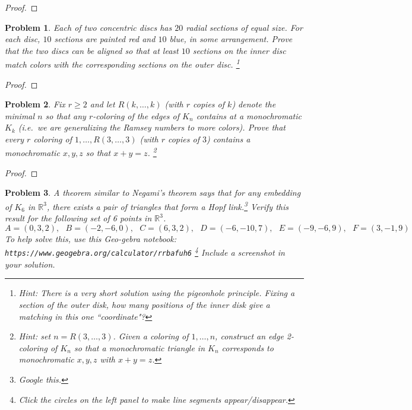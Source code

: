 \documentclass[11pt]{article}
\newtheorem{problem}{Problem}
\begin{document}
\begin{proof}

\end{proof}

\pagebreak 

\begin{problem}
Each of two concentric discs has $20$ radial sections of equal size. For each disc, $10$ sections are painted red and $10$ blue, in some arrangement. Prove that the two discs can be aligned so that at least $10$ sections on the inner disc match colors with the corresponding sections on the outer disc. \footnote{Hint: There is a very short solution using the pigeonhole principle. Fixing a section of the outer disk, how many positions of the inner disk give a matching in this one ``coordinate"?}
\end{problem}

\begin{proof}

\end{proof}

\pagebreak 

\begin{problem}
Fix $r\ge2$ and let $R(k,\ldots,k)$ (with $r$ copies of $k$) denote the minimal $n$ so that any $r$-coloring of the edges of $K_n$ contains at a monochromatic $K_k$ (i.e.\ we are generalizing the Ramsey numbers to more colors). Prove that every $r$ coloring of $1,\ldots,R(3,\ldots,3)$ (with $r$ copies of $3$) contains a monochromatic $x,y,z$ so that $x+y=z$. \footnote{Hint: set $n=R(3,\ldots,3)$. Given a coloring of $1,\ldots,n$, construct an edge 2-coloring of $K_n$ so that a monochromatic triangle in $K_n$ corresponds to monochromatic $x,y,z$ with $x+y=z$.} 
\end{problem}

\begin{proof}

\end{proof}

\pagebreak 

\begin{problem}
A theorem similar to Negami's theorem says that for any embedding of $K_6$ in $\mathbb R^3$, there exists a pair of triangles that form a Hopf link.\footnote{Google this.} Verify this result for the following set of 6 points in $\mathbb R^3$. 
\[A=(0,3,2), \>\>\>B=(-2,-6,0), \>\>\>C=(6,3,2), \>\>\>D=(-6,-10,7), \>\>\>E=(-9,-6,9),\>\>\>F=(3,-1,9)\]
To help solve this, use this Geo-gebra notebook: 
\texttt{https://www.geogebra.org/calculator/rrbafuh6} \footnote{Click the circles on the left panel to make line segments appear/disappear.} Include a screenshot in your solution. 
\end{problem}
\end{document}
